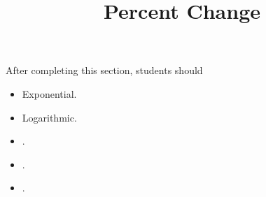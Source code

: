 \documentclass{ximera}
\title{Percent Change}
\begin{document}
\begin{abstract}
\end{abstract}
\maketitle

\begin{sectionOutcomes}
After completing this section, students should 

\begin{itemize}
\item Exponential.
\item Logarithmic.
\item .
\item .
\item .
\end{itemize}
\end{sectionOutcomes}
\end{document}
